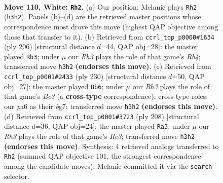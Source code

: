 \documentclass[11pt]{article}
\begin{document}
\clearpage

\begin{figure}[p]\centering
\begin{subfigure}{0.46\textwidth}\centering
\resizebox{\linewidth}{!}{%
\newchessgame
\chessboard[
  setfen={8/k7/p5r1/P1p2p1p/1p3P1P/1P2PKPR/8/8 w - - 7 110},
  showmover=false,
  pgfstyle=straightmove, color=movearrow, markmove={h3-h2}
]}
\caption{}
\end{subfigure}\hfill
\begin{subfigure}{0.46\textwidth}\centering
\resizebox{\linewidth}{!}{%
\newchessgame
\chessboard[
  setfen={8/2p5/3p2pk/r2Pp1p1/1RP1P3/5P1P/5K2/8 w - - 25 104},
  showmover=false,
  pgfstyle=straightmove, color=movearrow, markmove={b4-b3}
]}
\caption{}
\end{subfigure}
\\[4pt]
\begin{subfigure}{0.46\textwidth}\centering
\resizebox{\linewidth}{!}{%
\newchessgame
\chessboard[
  setfen={8/5kb1/2R3p1/5pPp/1r3P1P/4BPK1/8/8 w - - 13 116},
  showmover=false,
  pgfstyle=straightmove, color=movearrow, markmove={e3-b6}
]}
\caption{}
\end{subfigure}\hfill
\begin{subfigure}{0.46\textwidth}\centering
\resizebox{\linewidth}{!}{%
\newchessgame
\chessboard[
  setfen={8/5pk1/4p3/4Pp1p/5P1P/4R1PK/5r2/8 w - - 93 105},
  showmover=false,
  pgfstyle=straightmove, color=movearrow, markmove={e3-a3}
]}
\caption{}
\end{subfigure}
\caption{\textbf{Move 110, White: \texttt{Rh2}.} (a) Our position; Melanie plays \texttt{Rh2} (\texttt{h3h2}). Panels (b)--(d) are the retrieved master positions whose correspondence most drove this move (highest QAP objective among those that transfer to it). (b) Retrieved from \texttt{ccrl\_top\_p0000\#1634} (ply 206) [structural distance $d$=44, QAP obj=28]: the master played \texttt{Rb3}; under $\mu$ our \emph{Rh3} plays the role of that game's \emph{Rb4}; transferred move \texttt{h3h2} \textbf{(endorses this move)}. (c) Retrieved from \texttt{ccrl\_top\_p0001\#2433} (ply 230) [structural distance $d$=50, QAP obj=27]: the master played \texttt{Bb6}; under $\mu$ our \emph{Rh3} plays the role of that game's \emph{Be3} (a \textbf{cross-type} correspondence); cross-type roles: our \emph{p}a6 as their \emph{b}g7; transferred move \texttt{h3h2} \textbf{(endorses this move)}. (d) Retrieved from \texttt{ccrl\_top\_p0001\#3723} (ply 208) [structural distance $d$=36, QAP obj=24]: the master played \texttt{Ra3}; under $\mu$ our \emph{Rh3} plays the role of that game's \emph{Re3}; transferred move \texttt{h3h2} \textbf{(endorses this move)}. Synthesis: 4 retrieved analogs transferred to \texttt{Rh2} (summed QAP objective 101, the strongest correspondence among the candidate moves); Melanie committed it via the \texttt{search} selector.}
\label{fig:thought-m218}
\end{figure}
\end{document}
